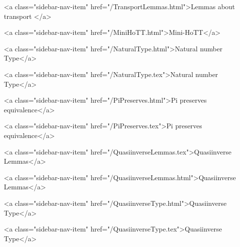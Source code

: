      
    
      
        
          <a class="sidebar-nav-item" href="/TransportLemmas.html">Lemmas about transport </a>
        
      
    
      
        
          <a class="sidebar-nav-item" href="/MiniHoTT.html">Mini-HoTT</a>
        
      
    
      
        
      
    
      
        
          <a class="sidebar-nav-item" href="/NaturalType.html">Natural number Type</a>
        
      
    
      
        
          <a class="sidebar-nav-item" href="/NaturalType.tex">Natural number Type</a>
        
      
    
      
        
          <a class="sidebar-nav-item" href="/PiPreserves.html">Pi preserves equivalence</a>
        
      
    
      
        
          <a class="sidebar-nav-item" href="/PiPreserves.tex">Pi preserves equivalence</a>
        
      
    
      
        
          <a class="sidebar-nav-item" href="/QuasiinverseLemmas.tex">Quasiinverse Lemmas</a>
        
      
    
      
        
          <a class="sidebar-nav-item" href="/QuasiinverseLemmas.html">Quasiinverse Lemmas</a>
        
      
    
      
        
          <a class="sidebar-nav-item" href="/QuasiinverseType.html">Quasiinverse Type</a>
        
      
    
      
        
          <a class="sidebar-nav-item" href="/QuasiinverseType.tex">Quasiinverse Type</a>
        
      
    
